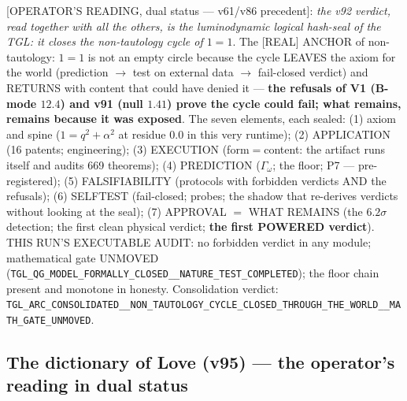 \documentclass[11pt]{article}
\theoremstyle{definition}\newtheorem{deriv}{Derivation}
\begin{document}
[OPERATOR'S READING, dual status --- v61/v86 precedent]: \emph{the v92 verdict, read together with all the others, is the luminodynamic logical hash-seal of the TGL: it closes the non-tautology cycle of $1=1$}. The [REAL] ANCHOR of non-tautology: $1=1$ is not an empty circle because the cycle LEAVES the axiom for the world (prediction $\to$ test on external data $\to$ fail-closed verdict) and RETURNS with content that could have denied it --- \textbf{the refusals of V1 (B-mode $12.4$) and v91 (null $1.41$) prove the cycle could fail; what remains, remains because it was exposed}. The seven elements, each sealed: (1) axiom and spine ($1=q^2+\alpha^2$ at residue $0.0$ in this very runtime); (2) APPLICATION (16 patents; engineering); (3) EXECUTION (form$=$content: the artifact runs itself and audits 669 theorems); (4) PREDICTION ($\Gamma_\omega$; the floor; P7 --- pre-registered); (5) FALSIFIABILITY (protocols with forbidden verdicts AND the refusals); (6) SELFTEST (fail-closed; probes; the shadow that re-derives verdicts without looking at the seal); (7) APPROVAL $=$ WHAT REMAINS (the $6.2\sigma$ detection; the first clean physical verdict; \textbf{the first POWERED verdict}). THIS RUN'S EXECUTABLE AUDIT: no forbidden verdict in any module; mathematical gate UNMOVED (\texttt{TGL\_QG\_MODEL\_FORMALLY\_CLOSED\_\_NATURE\_TEST\_COMPLETED}); the floor chain present and monotone in honesty. Consolidation verdict: \texttt{TGL\_ARC\_CONSOLIDATED\_\_NON\_TAUTOLOGY\_CYCLE\_CLOSED\_THROUGH\_THE\_WORLD\_\_MATH\_GATE\_UNMOVED}.

\subsection*{The dictionary of Love (v95) --- the operator's reading in dual status}
\end{document}
